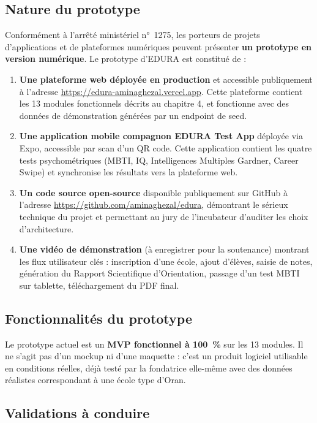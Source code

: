 \documentclass[12pt,a4paper,oneside]{report}
\begin{document}
\subsection{Nature du prototype}

Conformément à l'arrêté ministériel n°~1275, les porteurs de projets d'applications et de plateformes numériques peuvent présenter \textbf{un prototype en version numérique}. Le prototype d'EDURA est constitué de :

\begin{enumerate}
  \item \textbf{Une plateforme web déployée en production} et accessible publiquement à l'adresse \url{https://edura-aminaghezal.vercel.app}. Cette plateforme contient les 13 modules fonctionnels décrits au chapitre 4, et fonctionne avec des données de démonstration générées par un endpoint de seed.
  \item \textbf{Une application mobile compagnon EDURA Test App} déployée via Expo, accessible par scan d'un QR code. Cette application contient les quatre tests psychométriques (MBTI, IQ, Intelligences Multiples Gardner, Career Swipe) et synchronise les résultats vers la plateforme web.
  \item \textbf{Un code source open-source} disponible publiquement sur GitHub à l'adresse \url{https://github.com/aminaghezal/edura}, démontrant le sérieux technique du projet et permettant au jury de l'incubateur d'auditer les choix d'architecture.
  \item \textbf{Une vidéo de démonstration} (à enregistrer pour la soutenance) montrant les flux utilisateur clés : inscription d'une école, ajout d'élèves, saisie de notes, génération du Rapport Scientifique d'Orientation, passage d'un test MBTI sur tablette, téléchargement du PDF final.
\end{enumerate}

\subsection{Fonctionnalités du prototype}

Le prototype actuel est un \textbf{MVP fonctionnel à 100~\%} sur les 13 modules. Il ne s'agit pas d'un mockup ni d'une maquette : c'est un produit logiciel utilisable en conditions réelles, déjà testé par la fondatrice elle-même avec des données réalistes correspondant à une école type d'Oran.

\subsection{Validations à conduire}
\end{document}
